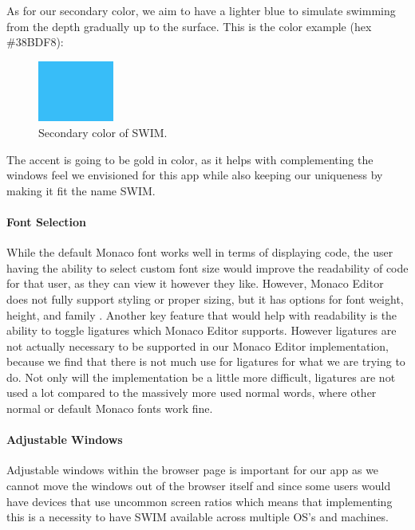 \documentclass[
    paper=letter,
    parskip=half,
    fontsize=12pt,
    titlepage=firstiscover,
    toc=bibliography,
    numbers=endperiod
]{scrartcl}
\begin{document}
As for our secondary color, we aim to have a lighter blue to simulate
swimming from the depth gradually up to the surface. This is the color
example (hex \#38BDF8):

\begin{figure}[H]
    \includegraphics[height=2cm]{color-secondary}
    \caption{Secondary color of SWIM.}
\end{figure}

The accent is going to be gold in color, as it helps with complementing
the windows feel we envisioned for this app while also keeping our
uniqueness by making it fit the name SWIM.

\paragraph{Font Selection}

While the default Monaco font works well in terms of displaying code,
the user having the ability to select custom font size would improve the
readability of code for that user, as they can view it however they
like. However, Monaco Editor does not fully support styling or proper
sizing, but it has options for font weight, height, and family
\cite{monaco-fontsize-issue}. Another key feature that would help with
readability is the ability to toggle ligatures which Monaco Editor
supports. However ligatures are not actually necessary to be supported
in our Monaco Editor implementation, because we find that there is not
much use for ligatures for what we are trying to do. Not only will the
implementation be a little more difficult, ligatures are not used a lot
compared to the massively more used normal words, where other normal or
default Monaco fonts work fine.

\paragraph{Adjustable Windows}

Adjustable windows within the browser page is important for our app as
we cannot move the windows out of the browser itself and since some
users would have devices that use uncommon screen ratios which means
that implementing this is a necessity to have SWIM available across
multiple OS's and machines.
\end{document}

